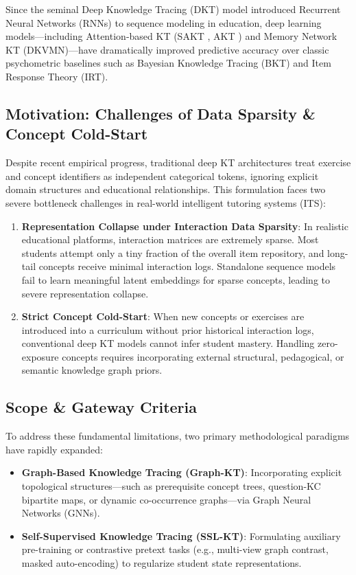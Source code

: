 ﻿\documentclass[10pt,journal,compsoc]{IEEEtran}
\begin{document}
Since the seminal Deep Knowledge Tracing (DKT) model \cite{Piech_DKT_2015} introduced Recurrent Neural Networks (RNNs) to sequence modeling in education, deep learning models---including Attention-based KT (SAKT \cite{Pandey_SAKT_2019}, AKT \cite{Ghosh_AKT_2020}) and Memory Network KT (DKVMN)---have dramatically improved predictive accuracy over classic psychometric baselines such as Bayesian Knowledge Tracing (BKT) and Item Response Theory (IRT).

\subsection{Motivation: Challenges of Data Sparsity \& Concept Cold-Start}
Despite recent empirical progress, traditional deep KT architectures treat exercise and concept identifiers as independent categorical tokens, ignoring explicit domain structures and educational relationships. This formulation faces two severe bottleneck challenges in real-world intelligent tutoring systems (ITS):
\begin{enumerate}
    \item \textbf{Representation Collapse under Interaction Data Sparsity}: In realistic educational platforms, interaction matrices are extremely sparse. Most students attempt only a tiny fraction of the overall item repository, and long-tail concepts receive minimal interaction logs. Standalone sequence models fail to learn meaningful latent embeddings for sparse concepts, leading to severe representation collapse.
    \item \textbf{Strict Concept Cold-Start}: When new concepts or exercises are introduced into a curriculum without prior historical interaction logs, conventional deep KT models cannot infer student mastery. Handling zero-exposure concepts requires incorporating external structural, pedagogical, or semantic knowledge graph priors.
\end{enumerate}

\subsection{Scope \& Gateway Criteria}
To address these fundamental limitations, two primary methodological paradigms have rapidly expanded:
\begin{itemize}
    \item \textbf{Graph-Based Knowledge Tracing (Graph-KT)}: Incorporating explicit topological structures---such as prerequisite concept trees, question-KC bipartite maps, or dynamic co-occurrence graphs---via Graph Neural Networks (GNNs).
    \item \textbf{Self-Supervised Knowledge Tracing (SSL-KT)}: Formulating auxiliary pre-training or contrastive pretext tasks (e.g., multi-view graph contrast, masked auto-encoding) to regularize student state representations.
\end{itemize}
\end{document}
